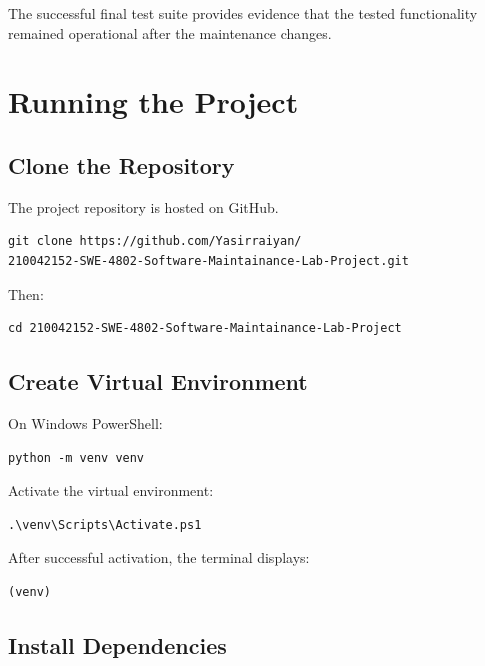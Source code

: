 \documentclass[12pt,a4paper]{report}
\begin{document}
The successful final test suite provides evidence that the tested
functionality remained operational after the maintenance changes.


\chapter{Running the Project}

\section{Clone the Repository}

The project repository is hosted on GitHub.

\begin{lstlisting}
git clone https://github.com/Yasirraiyan/
210042152-SWE-4802-Software-Maintainance-Lab-Project.git
\end{lstlisting}

Then:

\begin{lstlisting}
cd 210042152-SWE-4802-Software-Maintainance-Lab-Project
\end{lstlisting}

\section{Create Virtual Environment}

On Windows PowerShell:

\begin{lstlisting}
python -m venv venv
\end{lstlisting}

Activate the virtual environment:

\begin{lstlisting}
.\venv\Scripts\Activate.ps1
\end{lstlisting}

After successful activation, the terminal displays:

\begin{lstlisting}
(venv)
\end{lstlisting}

\section{Install Dependencies}
\end{document}
